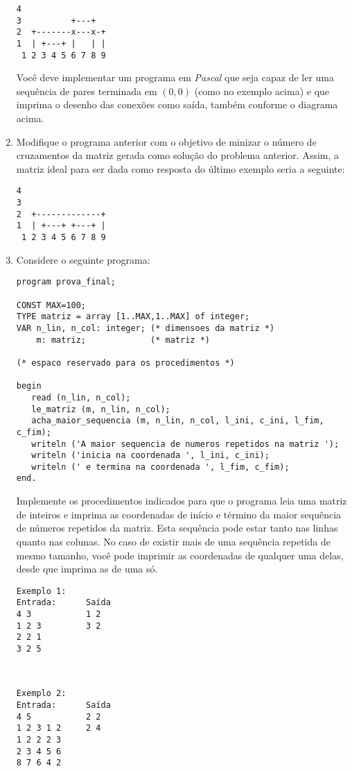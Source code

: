\begin{enumerate}
\begin{verbatim}
4
3          +---+ 
2  +-------x---x-+
1  | +---+ |   | |
 1 2 3 4 5 6 7 8 9
\end{verbatim}

Você deve implementar um programa em \emph{Pascal} que seja
capaz de ler uma sequência de pares terminada em $(0,0)$ (como no
exemplo acima) e que imprima o desenho das conexões como saída,
também conforme o diagrama acima. 


\item 
Modifique o programa anterior com o objetivo de minizar o número de cruzamentos
da matriz gerada como solução do problema anterior. Assim,
a matriz ideal para ser dada como resposta do último exemplo
seria a seguinte:

\begin{verbatim}
4
3           
2  +-------------+
1  | +---+ +---+ |
 1 2 3 4 5 6 7 8 9
\end{verbatim}

\item Considere o seguinte programa:

\begin{lstlisting}
program prova_final;

CONST MAX=100;
TYPE matriz = array [1..MAX,1..MAX] of integer;
VAR n_lin, n_col: integer; (* dimensoes da matriz *)
    m: matriz;             (* matriz *)

(* espaco reservado para os procedimentos *)

begin
   read (n_lin, n_col);
   le_matriz (m, n_lin, n_col);
   acha_maior_sequencia (m, n_lin, n_col, l_ini, c_ini, l_fim, c_fim);
   writeln ('A maior sequencia de numeros repetidos na matriz ');
   writeln ('inicia na coordenada ', l_ini, c_ini);
   writeln (' e termina na coordenada ', l_fim, c_fim);
end.
\end{lstlisting}


Implemente os procedimentos indicados para 
que o programa leia uma matriz de inteiros e imprima as coordenadas
de início e término da maior sequência de números repetidos da matriz.
Esta sequência pode estar tanto nas linhas quanto nas colunas. No caso
de existir mais de uma sequência repetida de mesmo tamanho, você pode
imprimir as coordenadas de qualquer uma delas, desde que imprima as de uma só.

\begin{minipage}{7cm}
\begin{verbatim}
Exemplo 1:
Entrada:      Saída
4 3           1 2 
1 2 3         3 2
2 2 1
3 2 5
\end{verbatim}
\end{minipage} \  
\begin{minipage}{7cm}
\begin{verbatim}
Exemplo 2:
Entrada:      Saída
4 5           2 2
1 2 3 1 2     2 4
1 2 2 2 3
2 3 4 5 6
8 7 6 4 2
\end{verbatim}
\end{minipage}




\end{enumerate}
